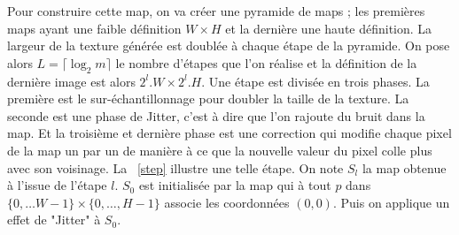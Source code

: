 \documentclass[12pt]{article}
\begin{document}
Pour construire cette map, on va créer une pyramide de maps ; les premières maps ayant une faible définition $W \times H$ et la dernière une haute définition. La largeur de la texture générée est doublée à chaque étape de la pyramide. On pose alors $L = \lceil \log_2 m \rceil$ le nombre d'étapes que l'on réalise et la définition de la dernière image est alors $2^l . W \times 2^l . H$. Une étape est divisée en trois phases. La première est le sur-échantillonnage pour doubler la taille de la texture. La seconde est une phase de Jitter, c'est à dire que l'on rajoute du bruit dans la map. Et la troisième et dernière phase est une correction qui modifie chaque pixel de la map un par un de manière à ce que la nouvelle valeur du pixel colle plus avec son voisinage. La \figurename~\ref{step} illustre une telle étape. On note $S_l$ la map obtenue à l'issue de l'étape $l$. $S_0$ est initialisée par la map qui à tout $p$ dans $\{ 0, \dots W-1 \} \times \{ 0, \dots, H-1 \}$ associe les coordonnées $(0, 0)$. Puis on applique un effet de "Jitter" à $S_0$.
\end{document}
